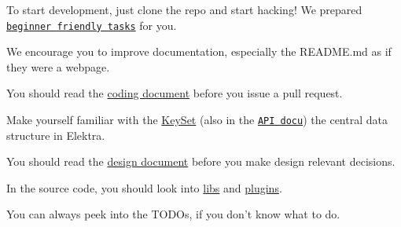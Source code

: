 To start development, just clone the repo and start hacking! We prepared \href{https://github.com/ElektraInitiative/libelektra/issues?q=is%3Aissue+is%3Aopen+label%3A%22beginner+friendly%22}{\tt beginner friendly tasks} for you.


\begin{DoxyItemize}
\item We encourage you to improve documentation, especially the R\+E\+A\+D\+M\+E.\+md as if they were a webpage.
\item You should read the \hyperlink{doc_CODING_md}{coding document} before you issue a pull request.
\item Make yourself familiar with the \hyperlink{md_doc_help_elektra-data-structures_doc_help_elektra-data-structures_md}{Key\+Set} (also in the \href{http://doc.libelektra.org/api/latest/html/group__keyset.html}{\tt A\+P\+I docu}) the central data structure in Elektra.
\item You should read the \hyperlink{doc_DESIGN_md}{design document} before you make design relevant decisions.
\item In the source code, you should look into \hyperlink{md_src_libs_README_src_libs_README_md}{libs} and \hyperlink{md_src_plugins_README_src_plugins_README_md}{plugins}.
\item You can always peek into the T\+O\+D\+Os, if you don't know what to do. 
\end{DoxyItemize}